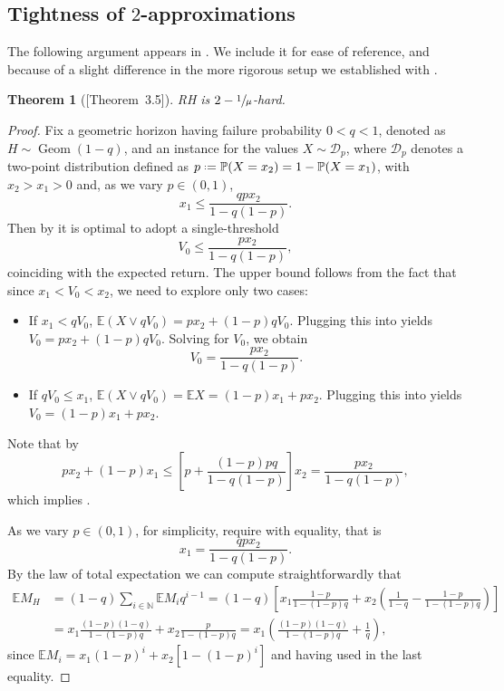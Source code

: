 \documentclass[11pt, a4paper, twoside]{article}
\newcommand*{\defeq}{\mathrel{\vcenter{\baselineskip0.5ex \lineskiplimit0pt
			\hbox{\scriptsize.}\hbox{\scriptsize.}}}=}
\newcommand{\NN}{\mathbb{N}}
\newcommand{\EE}{\mathbb{E}}
\newcommand{\PP}{\mathbb{P}}
\newcommand{\DD}{\mathcal{D}}
\DeclareMathOperator{\Geom}{Geom}
\newtheorem{theorem}{Theorem}[section]
\numberwithin{equation}{section}
\begin{document}
	\subsection{Tightness of $2$-approximations}\label{suppGclasstight}
	The following argument appears in \cite[Theorem~3.5]{AliBanGolMunWan20}. We include it for ease of reference, and because of a slight difference in the more rigorous setup we established with .
        \begin{theorem}[{\cite{AliBanGolMunWan20}[Theorem~3.5]}]
		RH is $2-\sfrac{1}{\mu}$-hard.
	\end{theorem}
	\begin{proof}
		Fix a geometric horizon having failure probability $0<q<1$, denoted as $H\sim\Geom(1-q)$, and an instance for the values $X\sim\DD_p$, where $\DD_p$ denotes a two-point distribution defined as $p\defeq\PP(X=x_2)=1-\PP(X=x_1)$, with $x_2>x_1>0$ and, as we vary $p\in(0,1)$,
		\begin{equation}\label{relation}
			x_1\le\frac{qpx_2}{1-q(1-p)}.
		\end{equation}
		Then by  it is optimal to adopt a single-threshold
		\begin{equation}\label{optprice}
			V_0\le\frac{px_2}{1-q(1-p)},
		\end{equation}
		coinciding with the expected return. The upper bound follows from the fact that since $x_1<V_0<x_2$, we need to explore only two cases:
		\begin{itemize}[noitemsep] 
			\item If $x_1<qV_0$, $\EE (X\vee qV_0)=px_2+(1-p)qV_0$. Plugging this into  yields $V_0=px_2+(1-p)qV_0$. Solving for $V_0$, we obtain \[V_0 = \frac{px_2}{1-q(1-p)}.\]
			\item If $qV_0\leq x_1$, $\EE (X\vee qV_0)=\EE X=(1-p)x_1+px_2$. Plugging this into  yields $V_0=(1-p)x_1+px_2$.
		\end{itemize}
		Note that by 
		\[px_2+(1-p)x_1\le\left[p+\frac{(1-p)pq}{1-q(1-p)}\right]x_2= \frac{px_2}{1-q(1-p)},\]
		which implies . 
		
		As we vary $p\in(0,1)$, for simplicity, require  with equality, that is 
		\begin{equation}\label{relationeq}
			x_1=\frac{qpx_2}{1-q(1-p)}.
		\end{equation}
		By the law of total expectation we can compute straightforwardly that
		\begin{align*}
			\EE M_H&=(1-q)\sum_{i\in\NN}\EE M_i q^{i-1}=(1-q)\left[x_1\frac{1-p}{1-(1-p)q}+x_2\left(\frac{1}{1-q}-\frac{1-p}{1-(1-p)q}\right)\right]\\&=x_1\frac{(1-p)(1-q)}{1-(1-p)q}+x_2\frac{p}{1-(1-p)q}=x_1\left(\frac{(1-p)(1-q)}{1-(1-p)q}+\frac{1}{q}\right),
		\end{align*}
		since $\EE M_i = x_1(1-p)^i+x_2[1-(1-p)^i]$ and having used  in the last equality.
		

\end{proof}
\end{document}
